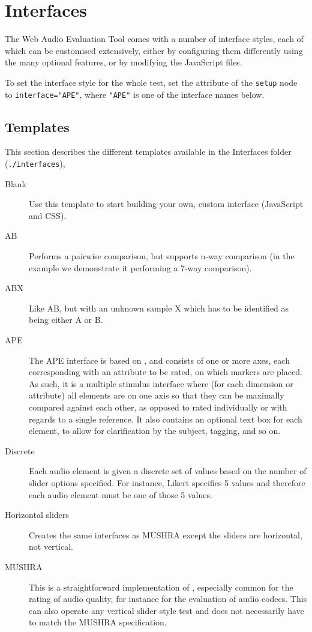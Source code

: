 \documentclass[11pt, oneside]{article}   	%
\begin{document}
\clearpage

\section{Interfaces}

	The Web Audio Evaluation Tool comes with a number of interface styles, each of which can be customised extensively, either by configuring them differently using the many optional features, or by modifying the JavaScript files. 

	To set the interface style for the whole test, set the attribute of the \texttt{setup} node to \texttt{interface="APE"}, where \texttt{"APE"} is one of the interface names below. 

	\subsection{Templates}
		This section describes the different templates available in the Interfaces folder (\texttt{./interfaces}), 

		\begin{description}
			\item[Blank] Use this template to start building your own, custom interface (JavaScript and CSS). 

			\item[AB] Performs a pairwise comparison, but supports n-way comparison (in the example we demonstrate it performing a 7-way comparison).

			\item[ABX] Like AB, but with an unknown sample X which has to be identified as being either A or B. 

			\item[APE] The APE interface is based on \cite{ape}, and consists of one or more axes, each corresponding with an attribute to be rated, on which markers are placed. As such, it is a multiple stimulus interface where (for each dimension or attribute) all elements are on one axis so that they can be maximally compared against each other, as opposed to rated individually or with regards to a single reference. 
			It also contains an optional text box for each element, to allow for clarification by the subject, tagging, and so on. 

			\item[Discrete] Each audio element is given a discrete set of values based on the number of slider options specified. For instance, Likert specifies 5 values and therefore each audio element must be one of those 5 values.

			\item[Horizontal sliders] Creates the same interfaces as MUSHRA except the sliders are horizontal, not vertical.

			\item[MUSHRA] This is a straightforward implementation of \cite{mushra}, especially common for the rating of audio quality, for instance for the evaluation of audio codecs. This can also operate any vertical slider style test and does not necessarily have to match the MUSHRA specification.
		\end{description}
		    
\end{document}
